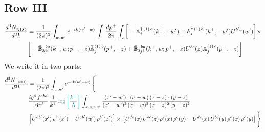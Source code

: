 \documentclass[9pt]{article}
\def\mf#1{\mathbb{#1}}
\numberwithin{equation}{section}
\begin{document}
\subsection{Row III}
\begin{align}
\frac{d^{3}N_{\rm NLO}^{\rm}}{d^{3}k}  & = \frac{1}{(2\pi)^{3}}  \int_{w, w^\prime} e^{-ik(w^\prime-w)}\, \int\,\frac{dp^{+}}{2\pi} \int_{z} \bigg[-\bar{\mf{A}}^{\dagger\,(1)\,a}_{i}(k^{+},-w^{\prime})+\mf{A}^{\dagger\, (1)\, b^{\prime}}_{i}(k^{+},-w^{\prime})U^{b^{\prime}a}(w^{\prime})\bigg]\times \notag \\ &  \bigg[-\Bar{\mf{B}}^{\dagger\, ba}_{3ji}(k^{+}, w; p^{+}, -z)\Bar{\mf{A}}^{(1)\,b}_{j}(p^{+}, - z)+ \Bar{\mf{B}}^{\dagger\, ba}_{3ji}(k^{+},w; p^{+},-z) U^{bc}(z) \mf{A}^{(1)\, c}_{j}(p^{+},- z)\bigg]\nonumber
\end{align}
We write it in two parts: 
\begin{align}
   \frac{d^{3}N_{1\,\rm NLO}^{\rm}}{d^{3}k}  & = \frac{1}{(2\pi)^{3}}  \int_{w, w^\prime} e^{-ik(w^\prime-w)}\, \Bigg\{\notag \\ & \frac{ig^{4}\,f^{abd}}{16\pi^{5}}\,\frac{1}{k^{+}}\,{\color{teal}\log{\left[\frac{k^{+}}{\Lambda}\right]}}\,\int_{x,y,z,x'} \frac{(x'-w')\cdot (x-w)\, (x-z)\cdot (y-z)}{(x'-w')^{2}\, (x-w)^{2}\, (x-z)^{2}\, (y-z)^{2}}\, \notag \\ & \left[U^{ab'}(x')\,\rho^{b'}(x')-U^{ab'}(w')\, \rho^{b'}(x')\right]\times\, \left[U^{de}(x)\,U^{bc}(z)\, \rho^{e}(x)\,\rho^{c}(y)-U^{de}(x)\,U^{bc}(y)\,\rho^{e}(x)\,\rho^{c}(y)\right]\Bigg\}
\end{align}
\end{document}
